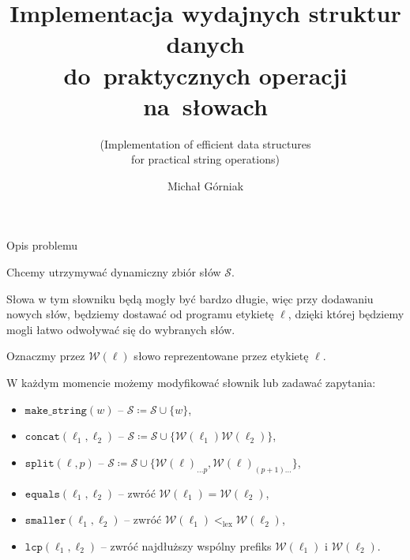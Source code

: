\documentclass[polish]{beamer}
\title[Prezentacja pracy licencjackiej]{Implementacja wydajnych struktur danych\\ do~praktycznych operacji na~słowach}
\subtitle{(Implementation of efficient data structures\\ for practical string operations)}
\author{Michał Górniak}
\institute[II UWr]{Instytut Informatyki Uniwersytetu Wrocławskiego}
\date{\displaydate{date}}
\begin{document}
\begin{frame}
    \titlepage
\end{frame}

\begin{frame}{Opis problemu}
    \begin{alertblock}{}
        Chcemy utrzymywać dynamiczny zbiór słów $\mathcal{S}$.
    \end{alertblock}
    \pause
    \begin{block}{}
        Słowa w tym słowniku będą mogły być bardzo długie, więc przy dodawaniu nowych słów, będziemy dostawać od programu etykietę $\ell$, dzięki której będziemy mogli łatwo odwoływać się do wybranych słów. 
    \end{block}
    \pause
    \begin{block}{}
        Oznaczmy przez $\mathcal{W}(\ell)$ słowo reprezentowane przez etykietę $\ell$.
    \end{block}
    \pause
    W każdym momencie możemy modyfikować słownik lub zadawać zapytania:
    \begin{itemize}
        \item $\texttt{make\_string}(w)$ -- $\mathcal{S} \coloneqq \mathcal{S} \cup \{w\}$,
        \item $\texttt{concat}(\ell_1, \ell_2)$ -- $\mathcal{S} \coloneqq \mathcal{S} \cup \{\mathcal{W}(\ell_1)\mathcal{W}(\ell_2)\}$,
        \item $\texttt{split}(\ell, p)$ -- $\mathcal{S} \coloneqq \mathcal{S} \cup \{\mathcal{W}(\ell)_{\ldots p}, \mathcal{W}(\ell)_{(p + 1) \ldots}\}$, \pause
        \item $\texttt{equals}(\ell_1, \ell_2)$ -- zwróć $\mathcal{W}(\ell_1) = \mathcal{W}(\ell_2)$,
        \item $\texttt{smaller}(\ell_1, \ell_2)$ -- zwróć $\mathcal{W}(\ell_1) <_{\text{lex}} \mathcal{W}(\ell_2)$,
        \item $\texttt{lcp}(\ell_1, \ell_2)$ -- zwróć najdłuższy wspólny prefiks $\mathcal{W}(\ell_1)$ i $\mathcal{W}(\ell_2)$.
    \end{itemize}
\end{frame}

\newsavebox{\firstbox}
\end{document}
